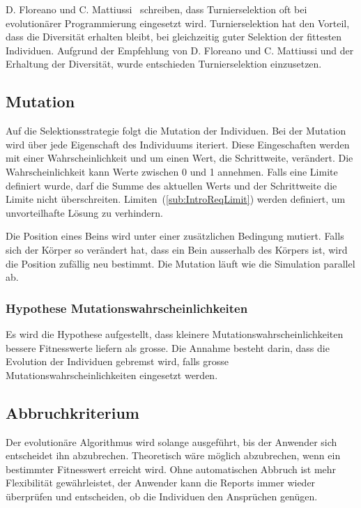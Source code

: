       D. Floreano und C. Mattiussi~\cite[S.33]{book:bioInspired} schreiben,
      dass Turnierselektion oft bei evolutionärer Programmierung eingesetzt wird.
      Turnierselektion hat den Vorteil, dass die Diversität erhalten bleibt,
      bei gleichzeitig guter Selektion der fittesten Individuen.
      Aufgrund der Empfehlung von D. Floreano und C. Mattiussi und der Erhaltung der Diversität,
      wurde entschieden Turnierselektion einzusetzen.

    \subsection{Mutation\label{sec:Mutation}}

      Auf die Selektionsstrategie folgt die Mutation der Individuen.
      Bei der Mutation wird über jede Eigenschaft des Individuums iteriert.
      Diese Eingeschaften werden mit einer Wahrscheinlichkeit und um einen Wert, die Schrittweite, verändert.
      Die Wahrscheinlichkeit kann Werte zwischen 0 und 1 annehmen.
      Falls eine Limite definiert wurde,
      darf die Summe des aktuellen Werts und der Schrittweite die Limite nicht überschreiten.
      Limiten~(\vref{sub:IntroReqLimit}) werden definiert, um unvorteilhafte Lösung zu verhindern.

      \medskip

      Die Position eines Beins wird unter einer zusätzlichen Bedingung mutiert. Falls sich der Körper so verändert hat,
      dass ein Bein ausserhalb des Körpers ist, wird die Position zufällig neu bestimmt.
      Die Mutation läuft wie die Simulation parallel ab.

      \subsubsection{Hypothese Mutationswahrscheinlichkeiten\label{subsub:hypoMut}}

        Es wird die Hypothese aufgestellt,
        dass kleinere Mutationswahrscheinlichkeiten bessere Fitnesswerte liefern als grosse.
        Die Annahme besteht darin, dass die Evolution der Individuen gebremst wird,
        falls grosse Mutationswahrscheinlichkeiten eingesetzt werden.

    \subsection{Abbruchkriterium}

      Der evolutionäre Algorithmus wird solange ausgeführt, bis der Anwender sich entscheidet ihn abzubrechen.
      Theoretisch wäre möglich abzubrechen, wenn ein bestimmter Fitnesswert erreicht wird.
      Ohne automatischen Abbruch ist mehr Flexibilität gewährleistet,
      der Anwender kann die Reports immer wieder überprüfen und entscheiden,
      ob die Individuen den Ansprüchen genügen.

